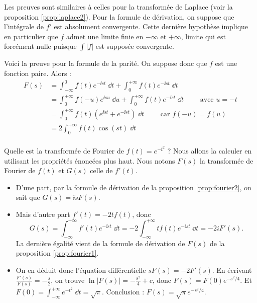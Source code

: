 \documentclass[class=report,crop=false]{standalone}
\begin{document}
Les preuves sont similaires à celles pour la transformée de Laplace (voir
la proposition \ref{prop:laplace2}).
Pour la formule de dérivation, on suppose que l'intégrale de $f'$ est absolument convergente.
Cette dernière hypothèse implique en particulier que $f$ admet une limite finie en $-\infty$ et 
$+\infty$, limite qui est forcément nulle puisque $\int |f|$ est supposée convergente.

Voici la preuve pour la formule de la parité. On suppose donc que 
$f$ est une fonction paire. Alors :
\begin{align*}
F(s) & = \int_{-\infty}^0 f(t)e^{-\ii st}\;\dd t
+\int_0^{+\infty} f(t)e^{-\ii st}\;\dd t \\
& = \int_0^{+\infty} f(-u)e^{\ii s u}\;\dd u
+\int_0^{+\infty} f(t)e^{-\ii st}\;\dd t \qquad \text{ avec } u=-t \\
& = \int_0^{+\infty} f(t)\left( e^{\ii st} + e^{-\ii st}\right) \;\dd t \qquad \text{ car } f(-u)=f(u)\\
& = 2 \int_0^{+\infty} f(t)\cos(st) \;\dd t\\
\end{align*}


\begin{exemple}
Quelle est la transformée de Fourier de $f(t) = e^{-t^2}$ ?
Nous allons la calculer en utilisant 
les propriétés énoncées plus haut.
Nous notons $F(s)$ la transformée de Fourier de $f(t)$ et $G(s)$ celle de $f'(t)$.
\begin{itemize}
  \item D'une part, par la formule de dérivation de la 
  proposition \ref{prop:fourier2}, on sait que $G(s) = \ii s F(s)$.
  
  \item Mais d'autre part $f'(t) = -2tf(t)$, donc
  $$G(s) = \int_{-\infty}^{+\infty} f'(t) e^{-\ii st}\;\dd t
  = -2 \int_{-\infty}^{+\infty} tf(t) e^{-\ii st}\;\dd t
  = -2i F'(s).$$
  La dernière égalité vient de la formule de dérivation de $F(s)$ de la 
  proposition \ref{prop:fourier1}.
  
  \item On en déduit donc l'équation différentielle 
  $s F(s) = -2 F'(s)$. En écrivant $\frac{F'(s)}{F(s)} = -\frac{s}{2}$,
  on trouve $\ln \big| F(s) \big| = -\frac{s^2}{4} + c$, donc
  $F(s) = F(0)e^{-s^2/4}$.
  Et $F(0) = \int_{-\infty}^{+\infty} e^{-t^2}\;\dd t= \sqrt{\pi}$.
  Conclusion : $F(s) =\sqrt{\pi}e^{-s^2/4}$.
  
\end{itemize}
\end{exemple}
\end{document}

